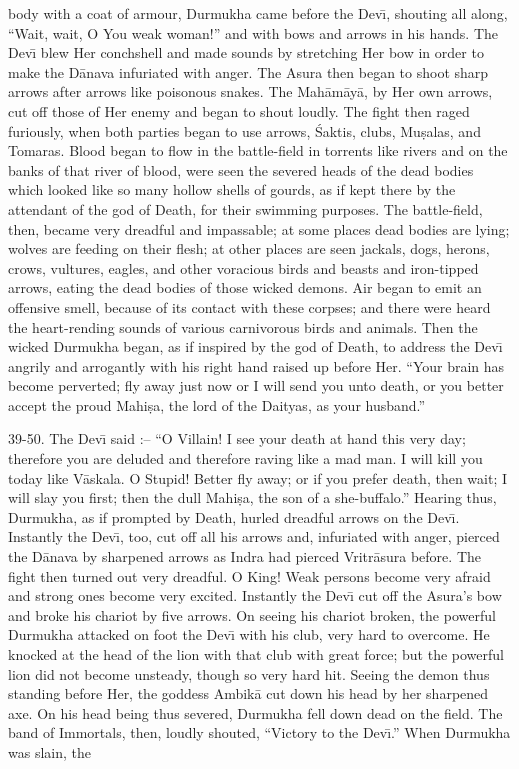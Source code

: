 body with a coat of armour, Durmukha came before the Dev\={\i}, shouting all along, ``Wait, wait, O You weak woman!'' and with bows and arrows in his hands. The Dev\={\i} blew Her conchshell and made sounds by stretching Her bow in order to make the D\=anava infuriated with anger. The Asura then began to shoot sharp arrows after arrows like poisonous snakes. The Mah\=am\=ay\=a, by Her own arrows, cut off those of Her enemy and began to shout loudly. The fight then raged furiously, when both parties began to use arrows, \'Saktis, clubs, Mu\d{s}alas, and Tomaras. Blood began to flow in the battle-field in torrents like rivers and on the banks of that river of blood, were seen the severed heads of the dead bodies which looked like so many hollow shells of gourds, as if kept there by the attendant of the god of Death, for their swimming purposes. The battle-field, then, became very dreadful and impassable; at some places dead bodies are lying; wolves are feeding on their flesh; at other places are seen jackals, dogs, herons, crows, vultures, eagles, and other voracious birds and beasts and iron-tipped arrows, eating the dead bodies of those wicked demons. Air began to emit an offensive smell, because of its contact with these corpses; and there were heard the heart-rending sounds of various carnivorous birds and animals. Then the wicked Durmukha began, as if inspired by the god of Death, to address the Dev\={\i} angrily and arrogantly with his right hand raised up before Her. ``Your brain has become perverted; fly away just now or I will send you unto death, or you better accept the proud Mahi\d{s}a, the lord of the Daityas, as your husband.''

39-50. The Dev\={\i} said :-- ``O Villain! I see your death at hand this very day; therefore you are deluded and therefore raving like a mad man. I will kill you today like V\=askala. O Stupid! Better fly away; or if you prefer death, then wait; I will slay you first; then the dull Mahi\d{s}a, the son of a she-buffalo.'' Hearing thus, Durmukha, as if prompted by Death, hurled dreadful arrows on the Dev\={\i}. Instantly the Dev\={\i}, too, cut off all his arrows and, infuriated with anger, pierced the D\=anava by sharpened arrows as Indra had pierced Vritr\=asura before. The fight then turned out very dreadful. O King! Weak persons become very afraid and strong ones become very excited. Instantly the Dev\={\i} cut off the Asura's bow and broke his chariot by five arrows. On seeing his chariot broken, the powerful Durmukha attacked on foot the Dev\={\i} with his club, very hard to overcome. He knocked at the head of the lion with that club with great force; but the powerful lion did not become unsteady, though so very hard hit. Seeing the demon thus standing before Her, the goddess Ambik\=a cut down his head by her sharpened axe. On his head being thus severed, Durmukha fell down dead on the field. The band of Immortals, then, loudly shouted, ``Victory to the Dev\={\i}.'' When Durmukha was slain, the

